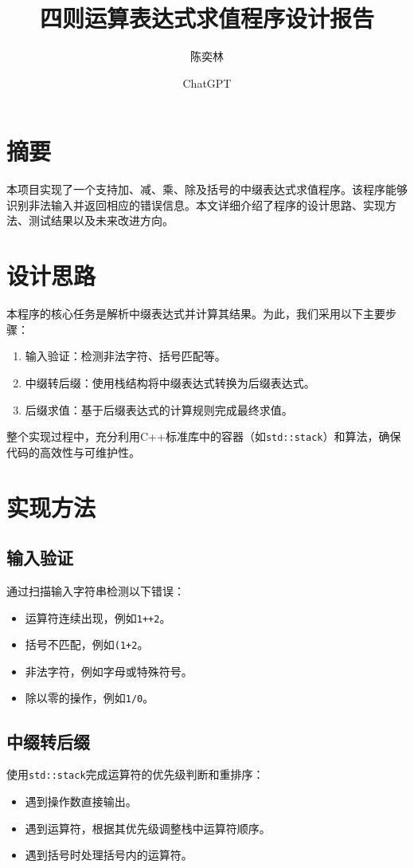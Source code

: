\documentclass{article}
\title{四则运算表达式求值程序设计报告}
\author{陈奕林 \and ChatGPT}
\begin{document}
\maketitle

\section*{摘要}
本项目实现了一个支持加、减、乘、除及括号的中缀表达式求值程序。该程序能够识别非法输入并返回相应的错误信息。本文详细介绍了程序的设计思路、实现方法、测试结果以及未来改进方向。

\section{设计思路}
本程序的核心任务是解析中缀表达式并计算其结果。为此，我们采用以下主要步骤：

\begin{enumerate}
    \item 输入验证：检测非法字符、括号匹配等。
    \item 中缀转后缀：使用栈结构将中缀表达式转换为后缀表达式。
    \item 后缀求值：基于后缀表达式的计算规则完成最终求值。
\end{enumerate}

整个实现过程中，充分利用C++标准库中的容器（如\texttt{std::stack}）和算法，确保代码的高效性与可维护性。

\section{实现方法}

\subsection{输入验证}
通过扫描输入字符串检测以下错误：
\begin{itemize}
    \item 运算符连续出现，例如\texttt{1++2}。
    \item 括号不匹配，例如\texttt{(1+2}。
    \item 非法字符，例如字母或特殊符号。
    \item 除以零的操作，例如\texttt{1/0}。
\end{itemize}

\subsection{中缀转后缀}
使用\texttt{std::stack}完成运算符的优先级判断和重排序：
\begin{itemize}
    \item 遇到操作数直接输出。
    \item 遇到运算符，根据其优先级调整栈中运算符顺序。
    \item 遇到括号时处理括号内的运算符。
\end{itemize}
\end{document}
